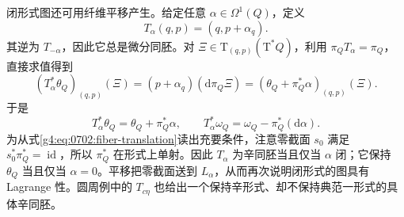 闭形式图还可用纤维平移产生。给定任意 \(\alpha\in\Omega^1(Q)\)，定义
\[
	T_\alpha(q,p)=(q,p+\alpha_q).
\]
其逆为 \(T_{-\alpha}\)，因此它总是微分同胚。对 \(\Xi\in\mathrm{T}_{(q,p)}(\mathrm{T}^*Q)\)，利用 \(\pi_QT_\alpha=\pi_Q\)，直接求值得到
\[
	(T_\alpha^*\theta_Q)_{(q,p)}(\Xi)
	=(p+\alpha_q)(\mathrm{d}\pi_Q\Xi)
	=(\theta_Q+\pi_Q^*\alpha)_{(q,p)}(\Xi).
\]
于是
\begin{equation}
	\label{g4:eq:0702:fiber-translation}
	T_\alpha^*\theta_Q=\theta_Q+\pi_Q^*\alpha,\qquad
	T_\alpha^*\omega_Q=\omega_Q-\pi_Q^*(\mathrm{d}\alpha).
\end{equation}
为从式\eqref{g4:eq:0702:fiber-translation}读出充要条件，注意零截面 \(s_0\) 满足 \(s_0^*\pi_Q^*=\operatorname{id}\)，所以 \(\pi_Q^*\) 在形式上单射。因此 \(T_\alpha\) 为辛同胚当且仅当 \(\alpha\) 闭；它保持 \(\theta_Q\) 当且仅当 \(\alpha=0\)。平移把零截面送到 \(L_\alpha\)，从而再次说明闭形式的图具有 Lagrange 性。圆周例中的 \(T_{c\eta}\) 也给出一个保持辛形式、却不保持典范一形式的具体辛同胚。
